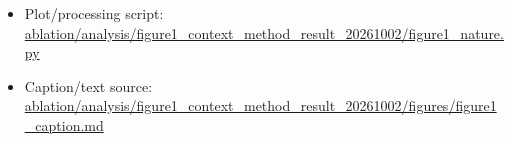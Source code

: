 \begin{itemize}[leftmargin=1.4em,noitemsep]
\item Plot/processing script: \begingroup\scriptsize\url{ablation/analysis/figure1_context_method_result_20261002/figure1_nature.py}\endgroup
\item Caption/text source: \begingroup\scriptsize\url{ablation/analysis/figure1_context_method_result_20261002/figures/figure1_caption.md}\endgroup
\end{itemize}
